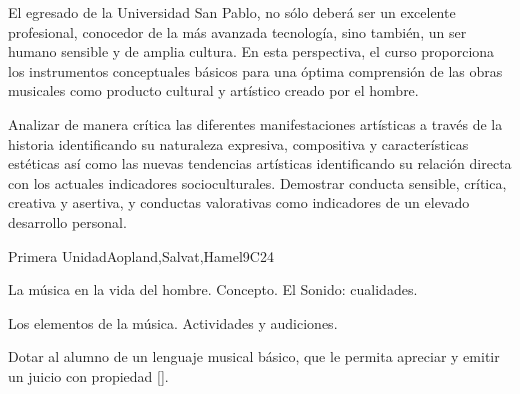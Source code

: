 \begin{syllabus}


\begin{justification}
El egresado de la Universidad San Pablo, no sólo deberá ser un excelente profesional, conocedor de la más avanzada tecnología, sino también, un ser humano sensible y de amplia cultura. En esta perspectiva, el curso proporciona los instrumentos conceptuales básicos para una óptima comprensión de las obras musicales como producto cultural y artístico creado por el hombre.
\end{justification}

\begin{goals}
\item Analizar de manera crítica las diferentes manifestaciones artísticas a través de la historia identificando su naturaleza expresiva, compositiva y características estéticas así como las nuevas tendencias artísticas identificando su relación directa con los actuales indicadores socioculturales. Demostrar conducta sensible, crítica, creativa y asertiva, y conductas valorativas como indicadores de un elevado desarrollo personal.
\end{goals}

\begin{outcomes}
    \item {}
    \item {}
\end{outcomes}

\begin{competences}
    \item {}
\end{competences}

\begin{unit}{}{Primera Unidad}{Aopland,Salvat,Hamel}{9}{C24}
\begin{topics}
	\item La música en la vida del hombre. Concepto. El Sonido: cualidades.
	\item Los elementos de la música. Actividades y audiciones.
\end{topics}
\begin{learningoutcomes}
	\item Dotar al alumno de un lenguaje musical básico, que le permita apreciar y emitir un juicio con propiedad [\Usage].
\end{learningoutcomes}
\end{unit}


\end{syllabus}
